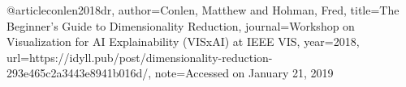 @article{conlen2018dr,
  author={Conlen, Matthew and Hohman, Fred},
  title={The Beginner's Guide to Dimensionality Reduction},
  journal={Workshop on Visualization for AI Explainability (VISxAI) at IEEE VIS},
  year={2018},
  url={https://idyll.pub/post/dimensionality-reduction-293e465c2a3443e8941b016d/},
  note={Accessed on January 21, 2019}
}
